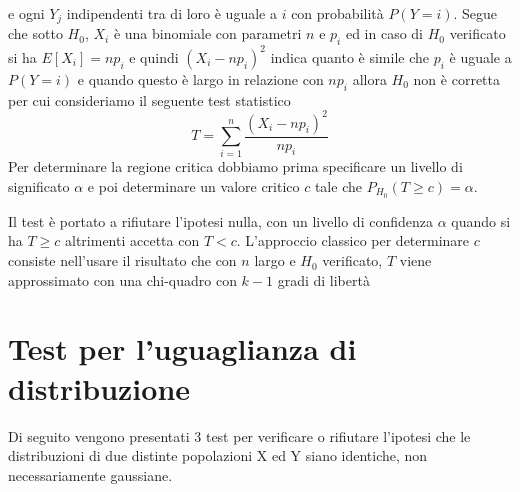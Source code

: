 \begin{itemize}
          e ogni $Y_j$ indipendenti tra di loro è uguale a $i$ con probabilità $P(Y = i)$.\newline
          Segue che sotto $H_0$, $X_i$ è una binomiale con parametri $n$ e $p_i$ ed in caso di $H_0$ verificato si ha $E[X_i] = np_i$ e quindi $(X_i - np_i)^2$ indica
          quanto è simile che $p_i$ è uguale a $P(Y = i)$ e quando questo è largo in relazione con $np_i$ allora $H_0$ non è corretta per cui consideriamo il seguente test statistico
          \[ T = \sum _{i = 1}^n \frac{(X_i - np_i)^2}{np_i} \]
          Per determinare la regione critica dobbiamo prima specificare un livello di significato $\alpha$ e poi determinare un valore critico $c$ tale che $P_{H_0}(T \geq c) = \alpha$.

          Il test è portato a rifiutare l'ipotesi nulla, con un livello di confidenza $\alpha$ quando si ha $T \geq c$ altrimenti accetta con $T < c$.\newline
          L'approccio classico per determinare $c$ consiste nell'usare il risultato che con $n$ largo e $H_0$ verificato, $T$ viene approssimato con una chi-quadro con $k - 1$
          gradi di libertà



\end{itemize}

\section{Test per l'uguaglianza di distribuzione}
Di seguito vengono presentati 3 test per verificare o rifiutare l'ipotesi che le distribuzioni
di due distinte popolazioni X ed Y siano identiche, non necessariamente gaussiane.

